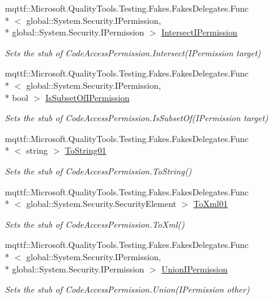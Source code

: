 \begin{DoxyCompactItemize}
mqttf\-::\-Microsoft.\-Quality\-Tools.\-Testing.\-Fakes.\-Fakes\-Delegates.\-Func\\*
$<$ global\-::\-System.\-Security.\-I\-Permission, \\*
global\-::\-System.\-Security.\-I\-Permission $>$ \hyperlink{class_system_1_1_security_1_1_fakes_1_1_stub_code_access_permission_a226f07de77bf797f8ccd023b75db9be9}{Intersect\-I\-Permission}
\begin{DoxyCompactList}\small\item\em Sets the stub of Code\-Access\-Permission.\-Intersect(\-I\-Permission target)\end{DoxyCompactList}\item 
mqttf\-::\-Microsoft.\-Quality\-Tools.\-Testing.\-Fakes.\-Fakes\-Delegates.\-Func\\*
$<$ global\-::\-System.\-Security.\-I\-Permission, \\*
bool $>$ \hyperlink{class_system_1_1_security_1_1_fakes_1_1_stub_code_access_permission_a0c5ea628a5111e3cb304769ea12e5bf5}{Is\-Subset\-Of\-I\-Permission}
\begin{DoxyCompactList}\small\item\em Sets the stub of Code\-Access\-Permission.\-Is\-Subset\-Of(\-I\-Permission target)\end{DoxyCompactList}\item 
mqttf\-::\-Microsoft.\-Quality\-Tools.\-Testing.\-Fakes.\-Fakes\-Delegates.\-Func\\*
$<$ string $>$ \hyperlink{class_system_1_1_security_1_1_fakes_1_1_stub_code_access_permission_ac9283b2519c7b1b664085acf463c2a55}{To\-String01}
\begin{DoxyCompactList}\small\item\em Sets the stub of Code\-Access\-Permission.\-To\-String()\end{DoxyCompactList}\item 
mqttf\-::\-Microsoft.\-Quality\-Tools.\-Testing.\-Fakes.\-Fakes\-Delegates.\-Func\\*
$<$ global\-::\-System.\-Security.\-Security\-Element $>$ \hyperlink{class_system_1_1_security_1_1_fakes_1_1_stub_code_access_permission_afaaf6886a9d64400a3746ddb276f9b91}{To\-Xml01}
\begin{DoxyCompactList}\small\item\em Sets the stub of Code\-Access\-Permission.\-To\-Xml()\end{DoxyCompactList}\item 
mqttf\-::\-Microsoft.\-Quality\-Tools.\-Testing.\-Fakes.\-Fakes\-Delegates.\-Func\\*
$<$ global\-::\-System.\-Security.\-I\-Permission, \\*
global\-::\-System.\-Security.\-I\-Permission $>$ \hyperlink{class_system_1_1_security_1_1_fakes_1_1_stub_code_access_permission_a402e45c4d970be3301b0950114c9768d}{Union\-I\-Permission}
\begin{DoxyCompactList}\small\item\em Sets the stub of Code\-Access\-Permission.\-Union(\-I\-Permission other)\end{DoxyCompactList}\end{DoxyCompactItemize}
